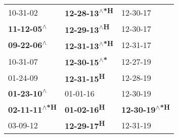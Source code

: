 \begin{supertabular}{lll}
                    10-31-02\textsuperscript{} &  \textbf{12-28-13\textsuperscript{$\wedge$*H}} &                     12-30-17\textsuperscript{} \\
   \textbf{11-12-05\textsuperscript{$\wedge$}} &   \textbf{12-29-13\textsuperscript{$\wedge$H}} &                     12-30-17\textsuperscript{} \\
   \textbf{09-22-06\textsuperscript{$\wedge$}} &  \textbf{12-31-13\textsuperscript{$\wedge$*H}} &                     12-31-17\textsuperscript{} \\
                    10-31-07\textsuperscript{} &   \textbf{12-30-15\textsuperscript{$\wedge$*}} &                     12-27-19\textsuperscript{} \\
                    01-24-09\textsuperscript{} &           \textbf{12-31-15\textsuperscript{H}} &                     12-28-19\textsuperscript{} \\
   \textbf{01-23-10\textsuperscript{$\wedge$}} &                     01-01-16\textsuperscript{} &                     12-30-19\textsuperscript{} \\
 \textbf{02-11-11\textsuperscript{$\wedge$*H}} &           \textbf{01-02-16\textsuperscript{H}} &  \textbf{12-30-19\textsuperscript{$\wedge$*H}} \\
                    03-09-12\textsuperscript{} &           \textbf{12-29-17\textsuperscript{H}} &                     12-31-19\textsuperscript{} \\
\end{supertabular}
